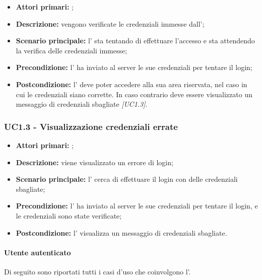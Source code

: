 \documentclass[casi-duso]{subfiles}
\begin{document}
\begin{itemize}
  \item \textbf{Attori primari:} ;
  \item \textbf{Descrizione:} vengono verificate le credenziali immesse dall';
  \item \textbf{Scenario principale:} l' sta tentando di effettuare l'accesso e sta attendendo la verifica delle credenziali immesse;
  \item \textbf{Precondizione:} l' ha inviato al server le sue credenziali per tentare il login;
  \item \textbf{Postcondizione:} l' deve poter accedere alla sua area riservata, nel caso in cui le credenziali siano corrette. In caso
        contrario deve essere visualizzato un messaggio di credenziali sbagliate \emph{[UC1.3]}.

\end{itemize}

\subsubsection{UC1.3 - Visualizzazione credenziali errate}
\label{subsub:UC1.3}

\begin{itemize}
  \item \textbf{Attori primari:} ;
  \item \textbf{Descrizione:} viene visualizzato un errore di login;
  \item \textbf{Scenario principale:} l' cerca di effettuare il login con delle credenziali sbagliate;
  \item \textbf{Precondizione:} l' ha inviato al server le sue credenziali per tentare il login, e le credenziali sono state verificate;
  \item \textbf{Postcondizione:} l' visualizza un messaggio di credenziali sbagliate.

\end{itemize}



\paragraph{Utente autenticato}
\label{par:utente-autenticato}
Di seguito sono riportati tutti i casi d'uso che coinvolgono l'.
\end{document}
